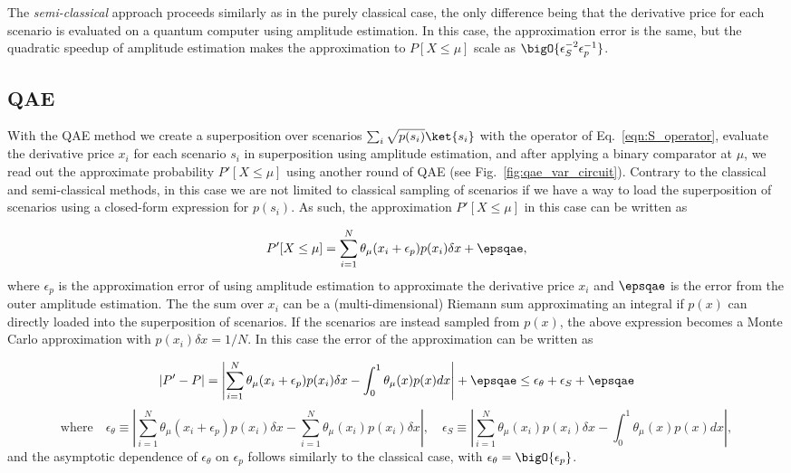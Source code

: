 \begin{enumerate}
The \emph{semi-classical} approach proceeds similarly as in the purely classical case, the only difference being that the derivative price for each scenario is evaluated on a quantum computer using amplitude estimation.
In this case, the approximation error is the same, but the quadratic speedup of amplitude estimation makes the approximation to $P[X \le \mu]$ scale as $\bigO{\epsilon_S^{-2}\epsilon_p^{-1}}$.

\subsection{QAE \var{}}
\label{sec:qae_error}
With the QAE \var{} method we create a superposition over scenarios $\sum_i\sqrt{p(s_i)}\ket{s_i}$ with the operator of Eq.~\eqref{eqn:S_operator}, evaluate the derivative price $x_i$ for each scenario $s_i$ in superposition using amplitude estimation, and after applying a binary comparator at $\mu$, we read out the approximate probability $P'[X \le \mu]$ using another round of QAE (see Fig.~\ref{fig:qae_var_circuit}).
Contrary to the classical and semi-classical methods, in this case we are not limited to classical sampling of scenarios if we have a way to load the superposition of scenarios using a closed-form expression for $p(s_i)$.
As such, the approximation $P'[X\le\mu]$ in this case can be written as

\begin{equation}
	P'[X \le \mu] = \sum_{i=1}^N \theta_{\mu}(x_i + \epsilon_p)p(x_i)\delta x + \epsqae,
\end{equation}
where $\epsilon_p$ is the approximation error of using amplitude estimation to approximate the derivative price $x_i$ and $\epsqae$ is the error from the outer amplitude estimation.
The the sum over $x_i$ can be a (multi-dimensional) Riemann sum approximating an integral if $p(x)$ can directly loaded into the superposition of scenarios.
If the scenarios are instead sampled from $p(x)$, the above expression becomes a Monte Carlo approximation with $p(x_i)\delta x=1/N$.
In this case the error of the approximation can be written as

\begin{equation}
	|P' - P| = \left| \sum_{i=1}^N \theta_{\mu}(x_i + \epsilon_p)p(x_i)\delta x  - \int_0^1 \theta_{\mu}(x)p(x)dx\right| + \epsqae \le \epsilon_{\theta} + \epsilon_S + \epsqae \nonumber
\end{equation}
\begin{equation}
	\label{eqn:qae_error_terms}
	\textrm{where} \quad \epsilon_{\theta} \equiv \left| \sum_{i=1}^N \theta_{\mu}(x_i + \epsilon_p)p(x_i)\delta x  - \sum_{i=1}^N \theta_{\mu}(x_i)p(x_i)\delta x \right|, \quad \epsilon_S \equiv \left| \sum_{i=1}^N \theta_{\mu}(x_i)p(x_i)\delta x  - \int_0^1 \theta_{\mu}(x)p(x)dx\right|,
\end{equation}
and the asymptotic dependence of $\epsilon_{\theta}$ on $\epsilon_p$ follows similarly to the classical case, with $\epsilon_{\theta} = \bigO{\epsilon_p}$.


\end{enumerate}
